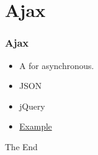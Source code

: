\documentclass{beamer}
\begin{document}
\section{Ajax}
\begin{frame}[fragile]
\frametitle{Ajax}
\begin{itemize}
\item A for asynchronous.
\item JSON
\item jQuery
\item
\href{https://simpleisbetterthancomplex.com/tutorial/2016/08/29/how-to-work-with-ajax-request-with-django.html}{Example}

\end{itemize}
\end{frame}



\begin{frame}
\Huge \centering The End
\end{frame}
\end{document}
